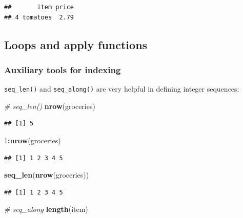 \documentclass[
  11pt,
]{article}
\newenvironment{Shaded}{\begin{snugshade}}{\end{snugshade}}
\newcommand{\CommentTok}[1]{\textcolor[rgb]{0.56,0.35,0.01}{\textit{#1}}}
\newcommand{\DecValTok}[1]{\textcolor[rgb]{0.00,0.00,0.81}{#1}}
\newcommand{\FunctionTok}[1]{\textcolor[rgb]{0.13,0.29,0.53}{\textbf{#1}}}
\newcommand{\NormalTok}[1]{#1}
\newcommand{\SpecialCharTok}[1]{\textcolor[rgb]{0.81,0.36,0.00}{\textbf{#1}}}
\begin{document}
\begin{verbatim}
##       item price
## 4 tomatoes  2.79
\end{verbatim}

\hypertarget{loops-and-apply-functions}{%
\subsection{Loops and apply functions}\label{loops-and-apply-functions}}

\hypertarget{auxiliary-tools-for-indexing}{%
\subsubsection{Auxiliary tools for indexing}\label{auxiliary-tools-for-indexing}}

\texttt{seq\_len()} and \texttt{seq\_along()} are very helpful in defining integer sequences:

\begin{Shaded}
\begin{Highlighting}[]
\CommentTok{\# seq\_len()}
\FunctionTok{nrow}\NormalTok{(groceries)}
\end{Highlighting}
\end{Shaded}

\begin{verbatim}
## [1] 5
\end{verbatim}

\begin{Shaded}
\begin{Highlighting}[]
\DecValTok{1}\SpecialCharTok{:}\FunctionTok{nrow}\NormalTok{(groceries)}
\end{Highlighting}
\end{Shaded}

\begin{verbatim}
## [1] 1 2 3 4 5
\end{verbatim}

\begin{Shaded}
\begin{Highlighting}[]
\FunctionTok{seq\_len}\NormalTok{(}\FunctionTok{nrow}\NormalTok{(groceries))}
\end{Highlighting}
\end{Shaded}

\begin{verbatim}
## [1] 1 2 3 4 5
\end{verbatim}

\begin{Shaded}
\begin{Highlighting}[]
\CommentTok{\# seq\_along}
\FunctionTok{length}\NormalTok{(item)}
\end{Highlighting}
\end{Shaded}
\end{document}
